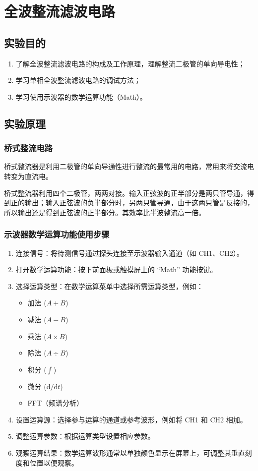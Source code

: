 \documentclass[UTF8, a4paper]{ctexrep} %
\begin{document}
\chapter{全波整流滤波电路} \label{sec:exp7_title_6}

\section{实验目的} \label{subsec:purpose_6}
\begin{enumerate}
    \item 了解全波整流滤波电路的构成及工作原理，理解整流二极管的单向导电性；
    \item 学习单相全波整流滤波电路的调试方法；
    \item 学习使用示波器的数学运算功能（Math）。
\end{enumerate}

\section{实验原理} \label{subsec:principle_6}
\subsection{桥式整流电路}
桥式整流器是利用二极管的单向导通性进行整流的最常用的电路，常用来将交流电转变为直流电。

桥式整流器利用四个二极管，两两对接。输入正弦波的正半部分是两只管导通，得到正的输出；输入正弦波的负半部分时，另两只管导通，由于这两只管是反接的，所以输出还是得到正弦波的正半部分。其效率比半波整流高一倍。

\subsection{示波器数学运算功能使用步骤}
\begin{enumerate}
    \item 连接信号：将待测信号通过探头连接至示波器输入通道（如 CH1、CH2）。
    \item 打开数学运算功能：按下前面板或触摸屏上的 ``Math'' 功能按键。
    \item 选择运算类型：在数学运算菜单中选择所需运算类型，例如：
        \begin{itemize}
            \item 加法 ($A+B$)
            \item 减法 ($A-B$)
            \item 乘法 ($A \times B$)
            \item 除法 ($A \div B$)
            \item 积分 ($\int$)
            \item 微分 ($\mathrm{d}/\mathrm{d}t$)
            \item FFT（频谱分析）
        \end{itemize}
    \item 设置运算源：选择参与运算的通道或参考波形，例如将 CH1 和 CH2 相加。
    \item 调整运算参数：根据运算类型设置相应参数。
    \item 观察运算结果：数学运算波形通常以单独颜色显示在屏幕上，可调整其垂直刻度和位置以便观察。
\end{enumerate}
\end{document}
